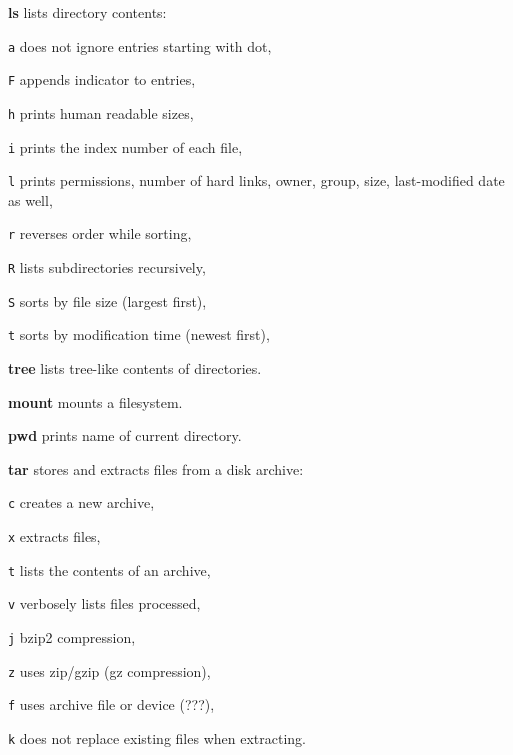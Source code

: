 \begin{enumx}
	\item [\cmdblack] \textbf{ls} lists directory contents:
	\item [\texttt{a}] does not ignore entries starting with dot, 
	\item [\texttt{F}] appends indicator to entries, 
	\item [\texttt{h}] prints human readable sizes, 
	\item [\texttt{i}] prints the index number of each file, 
	\item [\texttt{l}] prints permissions, number of hard links, owner, group, size, last-modified date as well, 
	\item [\texttt{r}] reverses order while sorting,
	\item [\texttt{R}] lists subdirectories recursively, 
	\item [\texttt{S}] sorts by file size (largest first), 
	\item [\texttt{t}] sorts by modification time (newest first), 
	\item [\cmd] \textbf{tree} lists tree-like contents of directories.
\end{enumx}

\begin{enumx}
	\item [\cmd] \textbf{mount} mounts a filesystem.
\end{enumx}

\begin{enumx}
	\item [\cmdblack] \textbf{pwd} prints name of current directory.
\end{enumx}

\begin{enumx}
	\item [\cmd] \textbf{tar} stores and extracts files from a disk archive:
	\item [\texttt{c}] creates a new archive,
	\item [\texttt{x}] extracts files,
	\item [\texttt{t}] lists the contents of an archive,
	\item [\texttt{v}] verbosely lists files processed,
	\item [\texttt{j}] bzip2 compression,
	\item [\texttt{z}] uses zip/gzip (gz compression),
	\item [\texttt{f}] uses archive file or device (???),
	\item [\texttt{k}] does not replace existing files when extracting.
\end{enumx}


